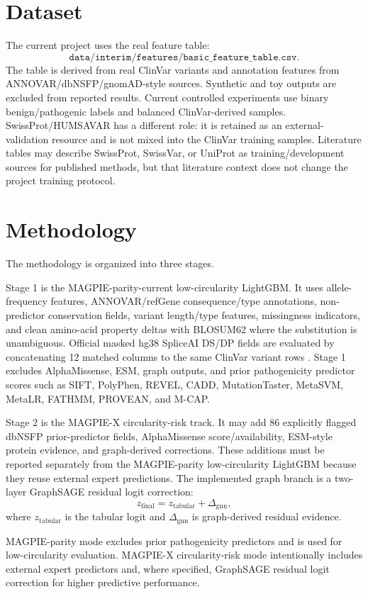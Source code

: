 \documentclass[conference]{IEEEtran}
\begin{document}
\section{Dataset}
The current project uses the real feature table:
\[
\texttt{data/interim/features/basic\_feature\_table.csv}.
\]
The table is derived from real ClinVar variants and annotation features from ANNOVAR/dbNSFP/gnomAD-style sources. Synthetic and toy outputs are excluded from reported results. Current controlled experiments use binary benign/pathogenic labels and balanced ClinVar-derived samples. SwissProt/HUMSAVAR has a different role: it is retained as an external-validation resource and is not mixed into the ClinVar training samples. Literature tables may describe SwissProt, SwissVar, or UniProt as training/development sources for published methods, but that literature context does not change the project training protocol.

\section{Methodology}
The methodology is organized into three stages.

Stage 1 is the MAGPIE-parity-current low-circularity LightGBM. It uses allele-frequency features, ANNOVAR/refGene consequence/type annotations, non-predictor conservation fields, variant length/type features, missingness indicators, and clean amino-acid property deltas with BLOSUM62 where the substitution is unambiguous. Official masked hg38 SpliceAI DS/DP fields are evaluated by concatenating 12 matched columns to the same ClinVar variant rows \cite{jaganathan2019spliceai}. Stage 1 excludes AlphaMissense, ESM, graph outputs, and prior pathogenicity predictor scores such as SIFT, PolyPhen, REVEL, CADD, MutationTaster, MetaSVM, MetaLR, FATHMM, PROVEAN, and M-CAP.

Stage 2 is the MAGPIE-X circularity-risk track. It may add 86 explicitly flagged dbNSFP prior-predictor fields, AlphaMissense score/availability, ESM-style protein evidence, and graph-derived corrections. These additions must be reported separately from the MAGPIE-parity low-circularity LightGBM because they reuse external expert predictions. The implemented graph branch is a two-layer GraphSAGE residual logit correction:
\[
z_{\mathrm{final}} = z_{\mathrm{tabular}} + \Delta_{\mathrm{gnn}},
\]
where $z_{\mathrm{tabular}}$ is the tabular logit and $\Delta_{\mathrm{gnn}}$ is graph-derived residual evidence.

MAGPIE-parity mode excludes prior pathogenicity predictors and is used for low-circularity evaluation. MAGPIE-X circularity-risk mode intentionally includes external expert predictors and, where specified, GraphSAGE residual logit correction for higher predictive performance.
\end{document}
